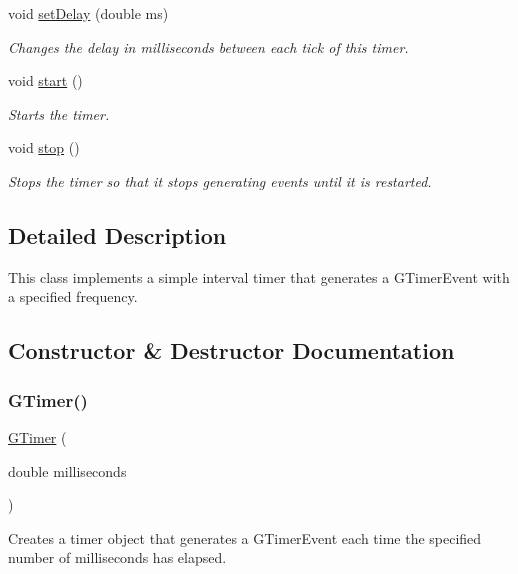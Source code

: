 \begin{DoxyCompactItemize}
void \mbox{\hyperlink{classGTimer_acebfcbc48c6acd460dac117a8f71a92f}{set\+Delay}} (double ms)
\begin{DoxyCompactList}\small\item\em Changes the delay in milliseconds between each tick of this timer. \end{DoxyCompactList}\item 
void \mbox{\hyperlink{classGTimer_a60de64d75454385b23995437f1d72669}{start}} ()
\begin{DoxyCompactList}\small\item\em Starts the timer. \end{DoxyCompactList}\item 
void \mbox{\hyperlink{classGTimer_a8c528baf37154d347366083f0f816846}{stop}} ()
\begin{DoxyCompactList}\small\item\em Stops the timer so that it stops generating events until it is restarted. \end{DoxyCompactList}\end{DoxyCompactItemize}


\subsection{Detailed Description}
This class implements a simple interval timer that generates a {\ttfamily G\+Timer\+Event} with a specified frequency. 

\subsection{Constructor \& Destructor Documentation}
\mbox{\label{classGTimer_ab947e096ce76b63f283502e4b4446810}} 
\subsubsection{\texorpdfstring{G\+Timer()}{GTimer()}}
{\footnotesize\ttfamily \mbox{\hyperlink{classGTimer}{G\+Timer}} (\begin{DoxyParamCaption}\item[{double}]{milliseconds }\end{DoxyParamCaption})}



Creates a timer object that generates a {\ttfamily G\+Timer\+Event} each time the specified number of milliseconds has elapsed. 

